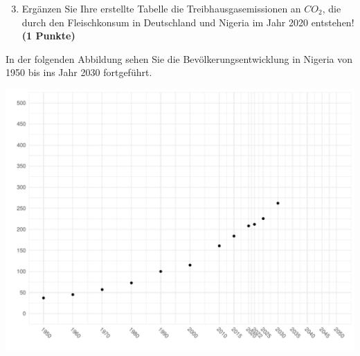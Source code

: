 \documentclass[a4paper, 10pt]{scrartcl}\usepackage[]{graphicx}\usepackage[]{xcolor}
\makeatletter
\def\maxwidth{ %
  \ifdim\Gin@nat@width>\linewidth
    \linewidth
  \else
    \Gin@nat@width
  \fi
}
\newenvironment{knitrout}{}{} %
\makeatother
\begin{document}
\begin{enumerate}
  \setcounter{enumi}{2}  
\item Erg{\"a}nzen Sie Ihre erstellte Tabelle die Treibhausgasemissionen an $CO_2$, die durch den
  Fleischkonsum in Deutschland und Nigeria im Jahr 2020 entstehen!
  \textbf{(1 Punkte)}
\end{enumerate}

\newpage

In der folgenden Abbildung sehen Sie die
Bev{\"o}lkerungsentwicklung in Nigeria von 1950 bis ins Jahr 2030 fortgef{\"u}hrt.

\begin{knitrout}
\color{fgcolor}

{\centering \includegraphics[width=\maxwidth]{img/math-14-c-1} 

}


\end{knitrout}
\end{document}

